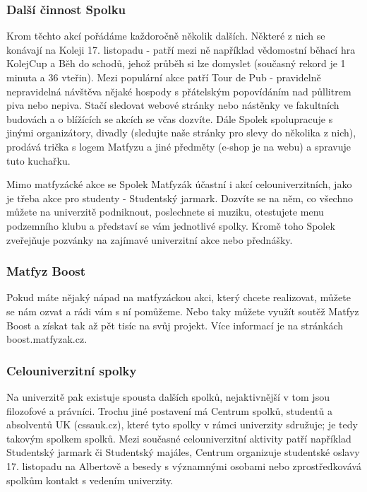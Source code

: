 \subsubsection{Další činnost Spolku}

Krom těchto akcí pořádáme každoročně několik dalších. Některé z nich se konávají
na Koleji 17. listopadu - patří mezi ně například vědomostní běhací hra KolejCup
a Běh do schodů, jehož průběh si lze domyslet (současný rekord je 1 minuta a 36
vteřin). Mezi populární akce patří Tour de Pub - pravidelně nepravidelná
návštěva nějaké hospody s přátelským popovídáním nad půllitrem piva nebo nepiva.
Stačí sledovat webové stránky nebo nástěnky ve fakultních budovách a o blížících
se akcích se včas dozvíte.
Dále Spolek spolupracuje s jinými organizátory, divadly (sledujte naše stránky
pro slevy do několika z nich), prodává trička s logem Matfyzu a jiné předměty
(e-shop je na webu) a spravuje tuto kuchařku.

Mimo matfyzácké akce se Spolek Matfyzák účastní i akcí celouniverzitních, jako
je třeba akce pro studenty - Studentský jarmark. Dozvíte se na něm, co všechno
můžete na univerzitě podniknout, poslechnete si muziku, otestujete menu
podzemního klubu a představí se vám jednotlivé spolky.
Kromě toho Spolek zveřejňuje pozvánky na zajímavé univerzitní akce nebo
přednášky.


\subsubsection{Matfyz Boost}

Pokud máte nějaký nápad na matfyzáckou akci, který chcete realizovat, můžete se
nám ozvat a rádi vám s ní pomůžeme. Nebo taky můžete využít soutěž Matfyz Boost
a získat tak až pět tisíc na svůj projekt. Více informací je na stránkách
boost.matfyzak.cz.


\subsubsection{Celouniverzitní spolky}

Na univerzitě pak existuje spousta dalších spolků, nejaktivnější v tom jsou
filozofové a právníci. Trochu jiné postavení má Centrum spolků, studentů a
absolventů UK (cssauk.cz), které tyto spolky v rámci univerzity sdružuje; je
tedy takovým spolkem spolků. Mezi současné celouniverzitní aktivity patří
například Studentský jarmark či Studentský majáles, Centrum organizuje
studentské oslavy 17. listopadu na Albertově a besedy s významnými osobami nebo
zprostředkovává spolkům kontakt s vedením univerzity.